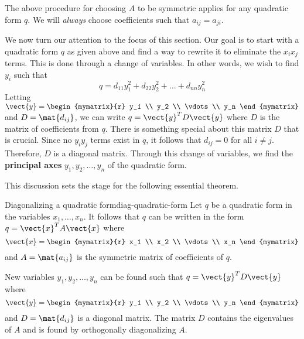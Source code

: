 The above procedure for choosing $A$ to be symmetric applies for any quadratic form $q$. We will \textit{always} choose coefficients such that $a_{ij}=a_{ji}$. 

We now turn our attention to the focus of this section. Our goal is to start with a quadratic form $q$ as given above and find a way to rewrite it to eliminate the $x_ix_j$ terms. This is done through a change of variables. In other words, we wish to find $y_i$ such that 
\[
q = d_{11}y_1^2 + d_{22}y_2^2 + \ldots + d_{nn}y_n^2
\]
 Letting $\vect{y} = \begin{mymatrix}{r}
y_1 \\
y_2 \\
\vdots \\
y_n
\end{mymatrix}$ and $D = \mat{d_{ij} }$, we can write $q = \vect{y}^T D \vect{y}$ where $D$ is the matrix of coefficients from $q$. There is something special about this matrix $D$ that is crucial. Since no $y_iy_j$ terms exist in $q$, it follows that $d_{ij} = 0$ for all $i \neq j$. Therefore, $D$ is a diagonal matrix. Through this change of variables, we find the \textbf{principal axes} $y_1, y_2,\ldots, y_n$ of the quadratic form. 

This discussion sets the stage for the following essential theorem.

\begin{theorem}{Diagonalizing a quadratic form}{diag-quadratic-form}
Let $q$ be a quadratic form in the variables $x_1,\ldots, x_n$. It follows that $q$ can be written in the form $q = \vect{x}^T A \vect{x}$ where 
\[
\vect{x} = \begin{mymatrix}{r}
x_1 \\
x_2 \\
\vdots \\
x_n
\end{mymatrix} 
\]
and $A = \mat{a_{ij} }$ is the symmetric matrix of coefficients of $q$. 

New variables $y_1, y_2,\ldots, y_n$ can be found such that $q = \vect{y}^T D \vect{y}$ where 
\[
\vect{y} = \begin{mymatrix}{r} 
y_1 \\
y_2 \\
\vdots \\
y_n
\end{mymatrix} \] and $D=\mat{d_{ij} }$ is a diagonal matrix. The matrix $D$ contains the eigenvalues of $A$ and is found by orthogonally diagonalizing $A$. 
\end{theorem}

